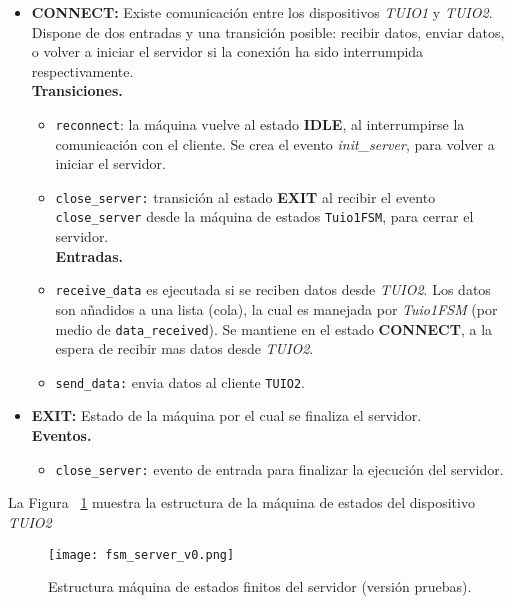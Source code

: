\begin{itemize}
\item \textbf{CONNECT:} Existe comunicación entre los dispositivos \emph{TUIO1} y \emph{TUIO2}. 
Dispone de dos entradas y una transición posible: recibir datos, enviar datos, o volver a iniciar el servidor si la conexión ha sido interrumpida respectivamente.\\
\textbf{Transiciones.}
\begin{itemize}
\item \texttt{reconnect}: la máquina vuelve al estado \textbf{IDLE}, al interrumpirse la comunicación con el cliente. Se crea el evento \emph{init\_server}, para volver a iniciar el servidor.
\item \texttt{close\_server:} transición al estado \textbf{EXIT} al recibir el evento \texttt{close\_server} desde la máquina de estados \texttt{Tuio1FSM}, para cerrar el servidor.\\
\textbf{Entradas.}
\item \texttt{receive\_data} es ejecutada si se reciben datos desde \emph{TUIO2}. Los datos son añadidos a una lista (cola), la cual es manejada por \emph{Tuio1FSM} (por medio de \texttt{data\_received}). Se mantiene en el estado \textbf{CONNECT}, a la espera de recibir mas datos desde \emph{TUIO2}.
\item \texttt{send\_data:} envia datos al cliente \texttt{TUIO2}.
\end{itemize}


\item \textbf{EXIT:} Estado de la máquina por el cual se finaliza el servidor.\\
\textbf{Eventos.}
\begin{itemize}
\item \texttt{close\_server:} evento de entrada para finalizar la ejecución del servidor.
\end{itemize}
\end{itemize}

La Figura ~\ref{fig:fsmserverv0} muestra la estructura de la máquina de estados del dispositivo \emph{TUIO2}

\begin{figure}[!h]
\begin{center}
\texttt{[image: fsm\_server\_v0.png]}
\caption{Estructura máquina de estados finitos del servidor (versión pruebas).}
\label{fig:fsmserverv0}
\end{center}
\end{figure}




